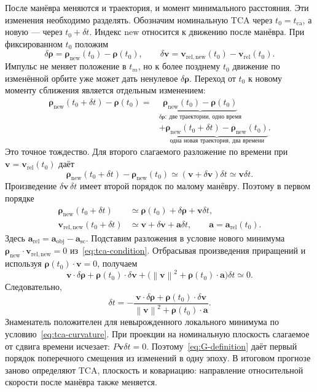 \documentclass[a4paper,11pt]{article}
\newcommand{\vect}[1]{\boldsymbol{#1}}
\newcommand{\norm}[1]{\left\lVert#1\right\rVert}
\numberwithin{equation}{section}
\begin{document}
После манёвра меняются и траектория, и момент минимального
расстояния. Эти изменения необходимо разделять.
Обозначим номинальную TCA через $t_0=t_{\mathrm{ca}}$,
а новую --- через $t_0+\delta t$.
Индекс $\mathrm{new}$ относится к движению после манёвра.
При фиксированном $t_0$ положим
\[
 \delta\vect\rho=\vect\rho_{\mathrm{new}}(t_0)-\vect\rho(t_0),
 \qquad
 \delta\vect v=\vect v_{\mathrm{rel,new}}(t_0)
                       -\vect v_{\mathrm{rel}}(t_0).
\]
Импульс не меняет положение в $t_m$, но к более позднему $t_0$
движение по изменённой орбите уже может дать ненулевое
$\delta\vect\rho$. Переход от $t_0$ к новому моменту
сближения является отдельным изменением:
\begin{equation}
 \begin{aligned}
 \vect\rho_{\mathrm{new}}(t_0+\delta t)-\vect\rho(t_0)
 ={}&\underbrace{\vect\rho_{\mathrm{new}}(t_0)-\vect\rho(t_0)}
 _{\delta\vect\rho:\ \text{две траектории, одно время}}\\[3mm]
 &+\underbrace{\vect\rho_{\mathrm{new}}(t_0+\delta t)
              -\vect\rho_{\mathrm{new}}(t_0)}
 _{\text{одна новая траектория, два времени}}.
 \end{aligned}
 \label{eq:two-changes}
\end{equation}
Это точное тождество. Для второго слагаемого разложение по времени
при $\vect v=\vect v_{\mathrm{rel}}(t_0)$ даёт
\[
 \vect\rho_{\mathrm{new}}(t_0+\delta t)-\vect\rho_{\mathrm{new}}(t_0)
 \simeq(\vect v+\delta\vect v)\delta t
 \simeq\vect v\delta t.
\]
Произведение $\delta\vect v\,\delta t$ имеет второй порядок
по малому манёвру. Поэтому в первом порядке
\[
 \begin{aligned}
 \vect\rho_{\mathrm{new}}(t_0+\delta t)
   &\simeq\vect\rho(t_0)+\delta\vect\rho+\vect v\delta t,\\
 \vect v_{\mathrm{rel,new}}(t_0+\delta t)
   &\simeq\vect v+\delta\vect v+\vect a\delta t,
 \qquad \vect a=\vect a_{\mathrm{rel}}(t_0).
 \end{aligned}
\]
Здесь $\vect a_{\mathrm{rel}}=\vect a_{\mathrm{obj}}-\vect a_{\mathrm{sc}}$.
Подставим разложения в условие нового минимума
$\vect\rho_{\mathrm{new}}\cdot\vect v_{\mathrm{rel,new}}=0$
из~\eqref{eq:tca-condition}. Отбрасывая произведения приращений
и используя $\vect\rho(t_0)\cdot\vect v=0$, получаем
\[
 \vect v\cdot\delta\vect\rho
 +\vect\rho(t_0)\cdot\delta\vect v
 +\bigl(\norm{\vect v}^2+\vect\rho(t_0)\cdot\vect a\bigr)\delta t
 \simeq0.
\]
Следовательно,
\begin{equation}
 \boxed{\quad
 \delta t=-\frac{\vect v\cdot\delta\vect\rho
           +\vect\rho(t_0)\cdot\delta\vect v}
          {\norm{\vect v}^2+\vect\rho(t_0)\cdot\vect a}.
 \quad}
 \label{eq:event-time}
\end{equation}
Знаменатель положителен для невырожденного локального минимума
по условию~\eqref{eq:tca-curvature}. При проекции на номинальную
плоскость слагаемое от сдвига времени исчезает:
$P\vect v\delta t=0$. Поэтому~\eqref{eq:G-definition}
даёт первый порядок поперечного смещения из изменений
в одну эпоху. В итоговом прогнозе заново определяют TCA,
плоскость и ковариацию: направление относительной скорости
после манёвра также меняется.
\end{document}
